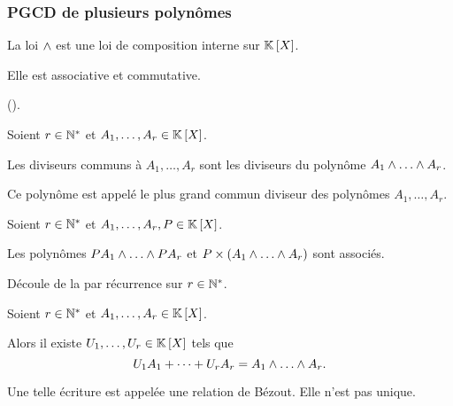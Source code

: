 \subsubsection{PGCD de plusieurs polynômes}

\begin{prop}
La loi \(\land\) est une loi de composition interne sur \(\poly\).

Elle est associative et commutative.
\end{prop}

\begin{dem}
 (\cf {}).
\end{dem}

\begin{defprop}
Soient \(r\in\mathbb{N}^*\) et \(A_1,\dots,A_r\in\poly\).

Les diviseurs communs à \(A_1,\dots,A_r\) sont les diviseurs du polynôme \(A_1\et\dots\et A_r\).

Ce polynôme est appelé le plus grand commun diviseur des polynômes \(A_1,\dots,A_r\).
\end{defprop}

\begin{dem}
\end{dem}

\begin{prop}
Soient \(r\in\mathbb{N}^*\) et \(A_1,\dots,A_r,P\in\poly\).

Les polynômes \(PA_1\et\dots\et PA_r\) et \(P\times\paren{A_1\et\dots\et A_r}\) sont associés.
\end{prop}

\begin{dem}
Découle de la  par récurrence sur \(r\in\mathbb{N}^*\).
\end{dem}

\begin{defprop}
Soient \(r\in\mathbb{N}^*\) et \(A_1,\dots,A_r\in\poly\).

Alors il existe \(U_1,\dots,U_r\in\poly\) tels que \[U_1A_1+\dots+U_rA_r=A_1\et\dots\et A_r.\]

Une telle écriture est appelée une relation de Bézout. Elle n'est pas unique.
\end{defprop}

